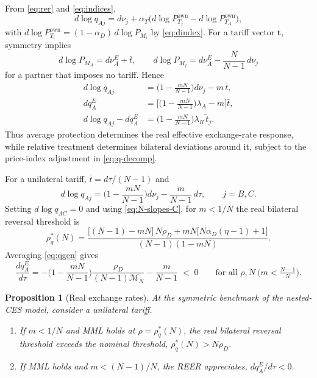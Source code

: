 \documentclass[11pt]{article}
\newtheorem{proposition}[theorem]{Proposition}
\begin{document}
From \eqref{eq:rer} and \eqref{eq:indices},
\begin{equation*}
d\log q_{Aj} = d\nu_j + \alpha_T \big( d\log P_{T_j}^{\mathrm{own}} - d\log P_{T_A}^{\mathrm{own}} \big),
\end{equation*}
with $d\log P_{T_i}^{\mathrm{own}}=(1-\alpha_D)\,d\log P_{M_i}$ by \eqref{eq:dindex}. For a tariff vector $\mathbf{t}$, symmetry implies
\[
d\log P_{M_A} = d\nu_A^E+\bar t,
\qquad
d\log P_{M_j} = d\nu_A^E-\frac{N}{N-1}\,d\nu_j
\]
for a partner that imposes no tariff. Hence
\begin{equation}
\begin{aligned}
d\log q_{Aj} &= \Big(1-\frac{mN}{N-1}\Big)d\nu_j - m\,\bar t,\\
dq_A^E &= \Big[\Big(1-\frac{mN}{N-1}\Big)\lambda_A-m\Big]\bar t,\\
d\log q_{Aj}-dq_A^E &= \Big(1-\frac{mN}{N-1}\Big)\lambda_R\,\tilde t_j.
\end{aligned}
\label{eq:q-decomp}
\end{equation}
Thus average protection determines the real effective exchange-rate response, while relative treatment determines bilateral deviations around it, subject to the price-index adjustment in \eqref{eq:q-decomp}.

For a unilateral tariff, $\bar t=d\tau/(N-1)$ and
\begin{equation}
d\log q_{Aj} = \Big(1-\frac{mN}{N-1}\Big)d\nu_j - \frac{m}{N-1}\,d\tau,
\qquad
j=B,C.
\label{eq:qgen}
\end{equation}
Setting $d\log q_{AC}=0$ and using \eqref{eq:N-slopes-C}, for $m<1/N$ the real bilateral reversal threshold is
\begin{equation}
\rho_q^*(N) = \frac{ \big[(N-1)-mN\big]\,N\rho_D + mN\big[N\alpha_D(\eta-1)+1\big] }{ (N-1)(1-mN) } .
\label{eq:N-rhoq}
\end{equation}
Averaging \eqref{eq:qgen} gives
\begin{equation}
\frac{dq_A^E}{d\tau} = -\Big(1-\frac{mN}{N-1}\Big)\frac{\rho_D}{(N-1)\mathcal M_N} - \frac{m}{N-1} \;<\; 0
\qquad
\text{for all } \rho,N \ \big(m<\tfrac{N-1}{N}\big).
\label{eq:N-reer}
\end{equation}

\begin{proposition}[Real exchange rates]
At the symmetric benchmark of the nested-CES model, consider a unilateral tariff.
\begin{enumerate}
\item[(i)] If $m<1/N$ and MML holds at $\rho=\rho_q^*(N)$, the real bilateral reversal threshold exceeds the nominal threshold, $\rho_q^*(N)>N\rho_D$.
\item[(ii)] If MML holds and $m<(N-1)/N$, the REER appreciates, $dq_A^E/d\tau<0$.
\end{enumerate}
\label{prop:real-rates}
\end{proposition}
\end{document}
